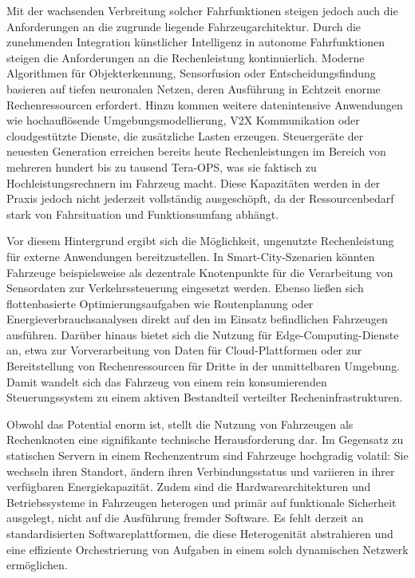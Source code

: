 Mit der wachsenden Verbreitung solcher Fahrfunktionen steigen jedoch auch die Anforderungen an die zugrunde liegende Fahrzeugarchitektur. Durch die zunehmenden Integration künstlicher Intelligenz in autonome Fahrfunktionen steigen die Anforderungen an die Rechenleistung kontinuierlich. Moderne Algorithmen für Objekterkennung, Sensorfusion oder Entscheidungsfindung basieren auf tiefen neuronalen Netzen, deren Ausführung in Echtzeit enorme Rechenressourcen erfordert. Hinzu kommen weitere datenintensive Anwendungen wie hochauflösende Umgebungsmodellierung, V2X Kommunikation oder cloudgestützte Dienste, die zusätzliche Lasten erzeugen. Steuergeräte der neuesten Generation erreichen bereits heute Rechenleistungen im Bereich von mehreren hundert bis zu tausend Tera-OPS, was sie faktisch zu Hochleistungsrechnern im Fahrzeug macht. Diese Kapazitäten werden in der Praxis jedoch nicht jederzeit vollständig ausgeschöpft, da der Ressourcenbedarf stark von Fahrsituation und Funktionsumfang abhängt.

Vor diesem Hintergrund ergibt sich die Möglichkeit, ungenutzte Rechenleistung für externe Anwendungen bereitzustellen. In Smart-City-Szenarien könnten Fahrzeuge beispielsweise als dezentrale Knotenpunkte für die Verarbeitung von Sensordaten zur Verkehrssteuerung eingesetzt werden. Ebenso ließen sich flottenbasierte Optimierungsaufgaben wie Routenplanung oder Energieverbrauchsanalysen direkt auf den im Einsatz befindlichen Fahrzeugen ausführen. Darüber hinaus bietet sich die Nutzung für Edge-Computing-Dienste an, etwa zur Vorverarbeitung von Daten für Cloud-Plattformen oder zur Bereitstellung von Rechenressourcen für Dritte in der unmittelbaren Umgebung. Damit wandelt sich das Fahrzeug von einem rein konsumierenden Steuerungssystem zu einem aktiven Bestandteil verteilter Recheninfrastrukturen.

Obwohl das Potential enorm ist, stellt die Nutzung von Fahrzeugen als Rechenknoten eine signifikante technische Herausforderung dar. Im Gegensatz zu statischen Servern in einem Rechenzentrum sind Fahrzeuge hochgradig volatil: Sie wechseln ihren Standort, ändern ihren Verbindungsstatus und variieren in ihrer verfügbaren Energiekapazität. Zudem sind die Hardwarearchitekturen und Betriebssysteme in Fahrzeugen heterogen und primär auf funktionale Sicherheit ausgelegt, nicht auf die Ausführung fremder Software. Es fehlt derzeit an standardisierten Softwareplattformen, die diese Heterogenität abstrahieren und eine effiziente Orchestrierung von Aufgaben in einem solch dynamischen Netzwerk ermöglichen.

